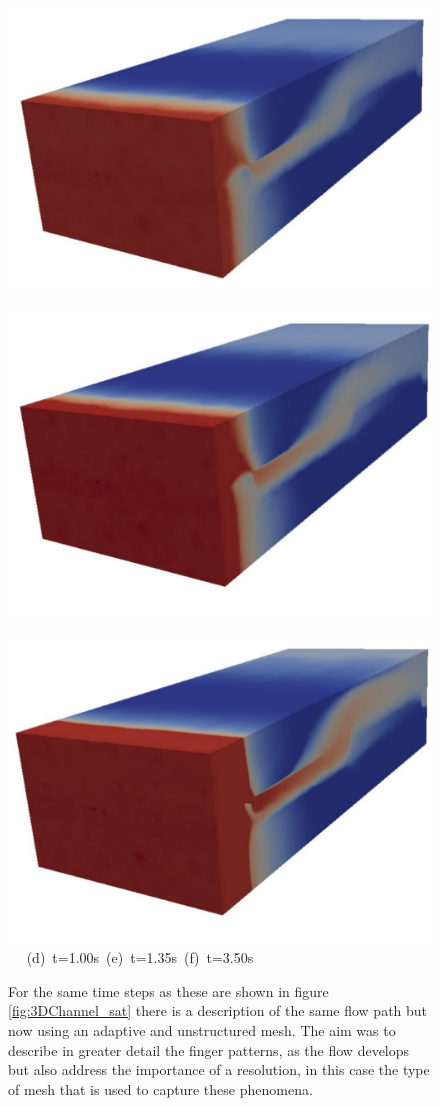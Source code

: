 \begin{landscape}
\begin{figure}[ht]
{      \vspace{1.5cm}
      \hbox{\hspace{.5cm} \includegraphics[width=.45\textwidth]{./Pics1/3D_Channel/3D_channel_sat_adapt_110.pdf}
            \includegraphics[width=.45\textwidth]{./Pics1/3D_Channel/3D_channel_sat_adapt_150.pdf}
            \includegraphics[width=.45\textwidth]{./Pics1/3D_Channel/3D_channel_sat_adapt_288.pdf} }
      \hbox{\hspace{3.cm} (d) t=1.00s \hspace{3.cm} (e) t=1.35s\hspace{4.cm} (f) t=3.50s }}
\caption{For the same time steps as these are shown in figure \ref{fig:3DChannel_sat} there is a description of the same flow path but now using an adaptive and unstructured mesh. The aim was to describe in greater detail the finger patterns, as the flow develops but also address the importance of a resolution, in this case the type of mesh that is used to capture these phenomena.}
\label{fig:3DChannel_sat_adapt}
\end{figure}
\end{landscape}
\clearpage



